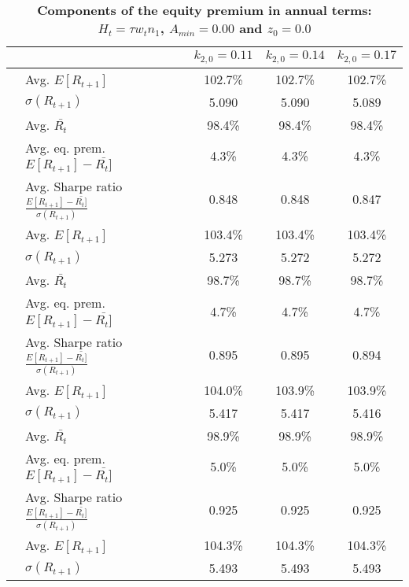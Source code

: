 \documentclass[letterpaper,12pt]{article}
\theoremstyle{definition}
\begin{document}
\begin{spacing}{1.5}
  \begin{table}[htbp]\centering\captionsetup{width=6.0in}
    \caption{\label{TabEqPrem_tA0}\textbf{Components of the equity premium in annual terms: $H_t = \tau w_t n_1$, $A_{min}=0.00$ and $z_0=0.0$}}
    \begin{threeparttable}
    \begin{tabular}{>{\small}l| >{\small}l| >{\small}c| >{\small}c| >{\small}c}
      \hline\hline
      & & $k_{2,0}=0.11$ & $k_{2,0}=0.14$ & $k_{2,0}=0.17$ \\
      \hline
      \multirow{5}{*}{$\tau=0.00$} & \quad Avg. $E[R_{t+1}]$ & 102.7\% & 102.7\% & 102.7\% \\
      & \quad $\sigma(R_{t+1})$ & 5.090 & 5.090 & 5.089 \\
      & \quad Avg. $\bar{R_t}$ & 98.4\% & 98.4\% & 98.4\% \\
      & \quad Avg. eq. prem. $E[R_{t+1}] - \bar{R_t]}$ & 4.3\% & 4.3\% & 4.3\% \\
      & \quad Avg. Sharpe ratio $\frac{E[R_{t+1}] - \bar{R_t]}}{\sigma(R_{t+1})}$ & 0.848 & 0.848 & 0.847 \\
      \hline
      \multirow{5}{*}{$\tau=0.11$} & \quad Avg. $E[R_{t+1}]$ & 103.4\% & 103.4\% & 103.4\% \\
      & \quad $\sigma(R_{t+1})$ & 5.273 & 5.272 & 5.272 \\
      & \quad Avg. $\bar{R_t}$ & 98.7\% & 98.7\% & 98.7\% \\
      & \quad Avg. eq. prem. $E[R_{t+1}] - \bar{R_t]}$ & 4.7\% & 4.7\% & 4.7\% \\
      & \quad Avg. Sharpe ratio $\frac{E[R_{t+1}] - \bar{R_t]}}{\sigma(R_{t+1})}$ & 0.895 & 0.895 & 0.894 \\
      \hline
      \multirow{5}{*}{$\tau=0.20$} & \quad Avg. $E[R_{t+1}]$ & 104.0\% & 103.9\% & 103.9\% \\
      & \quad $\sigma(R_{t+1})$ & 5.417 & 5.417 & 5.416 \\
      & \quad Avg. $\bar{R_t}$ & 98.9\% & 98.9\% & 98.9\% \\
      & \quad Avg. eq. prem. $E[R_{t+1}] - \bar{R_t]}$ & 5.0\% & 5.0\% & 5.0\% \\
      & \quad Avg. Sharpe ratio $\frac{E[R_{t+1}] - \bar{R_t]}}{\sigma(R_{t+1})}$ & 0.925 & 0.925 & 0.925 \\
      \hline
      \multirow{5}{*}{$\tau=0.25$} & \quad Avg. $E[R_{t+1}]$ & 104.3\% & 104.3\% & 104.3\% \\
      & \quad $\sigma(R_{t+1})$ & 5.493 & 5.493 & 5.493 \\

\end{tabular}
\end{threeparttable}
\end{table}
\end{spacing}
\end{document}
